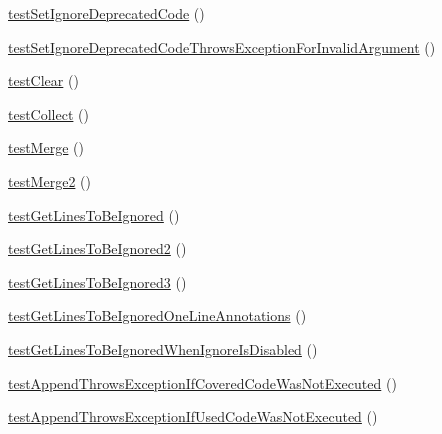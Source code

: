 \begin{DoxyCompactItemize}
\item 
\mbox{\hyperlink{class_sebastian_bergmann_1_1_code_coverage_1_1_code_coverage_test_af6a6750d033caa7e9aa165a95ce2ebfd}{test\+Set\+Ignore\+Deprecated\+Code}} ()
\item 
\mbox{\hyperlink{class_sebastian_bergmann_1_1_code_coverage_1_1_code_coverage_test_ae0d0bab2d67bf618af0ff043458635b2}{test\+Set\+Ignore\+Deprecated\+Code\+Throws\+Exception\+For\+Invalid\+Argument}} ()
\item 
\mbox{\hyperlink{class_sebastian_bergmann_1_1_code_coverage_1_1_code_coverage_test_ad6cb8ebcec2d653fc5f93a85876a560a}{test\+Clear}} ()
\item 
\mbox{\hyperlink{class_sebastian_bergmann_1_1_code_coverage_1_1_code_coverage_test_acc07fa0375ca50656f0a38bbcd76cb1e}{test\+Collect}} ()
\item 
\mbox{\hyperlink{class_sebastian_bergmann_1_1_code_coverage_1_1_code_coverage_test_a1a74d2fb6ec94ba4366bf3670ea61a6c}{test\+Merge}} ()
\item 
\mbox{\hyperlink{class_sebastian_bergmann_1_1_code_coverage_1_1_code_coverage_test_ac92532487af7ac43dd66d78831145afa}{test\+Merge2}} ()
\item 
\mbox{\hyperlink{class_sebastian_bergmann_1_1_code_coverage_1_1_code_coverage_test_a66026bd8c9c1940ed50feb6f1fd3aeb7}{test\+Get\+Lines\+To\+Be\+Ignored}} ()
\item 
\mbox{\hyperlink{class_sebastian_bergmann_1_1_code_coverage_1_1_code_coverage_test_a39d5e03e0f537a2206a371eb3fe3f9a9}{test\+Get\+Lines\+To\+Be\+Ignored2}} ()
\item 
\mbox{\hyperlink{class_sebastian_bergmann_1_1_code_coverage_1_1_code_coverage_test_af44920994ca64c2a03d47ce1d7d93ce4}{test\+Get\+Lines\+To\+Be\+Ignored3}} ()
\item 
\mbox{\hyperlink{class_sebastian_bergmann_1_1_code_coverage_1_1_code_coverage_test_a2ad56c6ec104960e923a788af408260a}{test\+Get\+Lines\+To\+Be\+Ignored\+One\+Line\+Annotations}} ()
\item 
\mbox{\hyperlink{class_sebastian_bergmann_1_1_code_coverage_1_1_code_coverage_test_ac8fffe9ca748b1a2fdb5eced0f5aa9fd}{test\+Get\+Lines\+To\+Be\+Ignored\+When\+Ignore\+Is\+Disabled}} ()
\item 
\mbox{\hyperlink{class_sebastian_bergmann_1_1_code_coverage_1_1_code_coverage_test_af31e3091686690578619a17d5ff3e689}{test\+Append\+Throws\+Exception\+If\+Covered\+Code\+Was\+Not\+Executed}} ()
\item 
\mbox{\hyperlink{class_sebastian_bergmann_1_1_code_coverage_1_1_code_coverage_test_ac6d545e78084803a2292ee503b01b6bd}{test\+Append\+Throws\+Exception\+If\+Used\+Code\+Was\+Not\+Executed}} ()
\end{DoxyCompactItemize}
